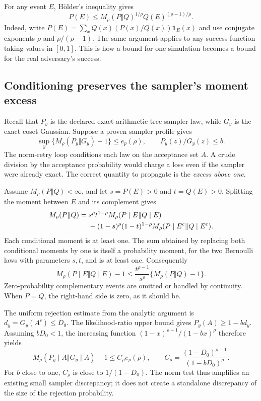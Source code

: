 \documentclass[11pt,a4paper]{article}
\theoremstyle{definition}
\theoremstyle{remark}
\numberwithin{equation}{section}
\begin{document}
For any event $E$, H\"older's inequality gives
\begin{equation}
 P(E)\le M_\rho(P\Vert Q)^{1/\rho}
                  Q(E)^{(\rho-1)/\rho}.
 \label{eq:event-transfer}
\end{equation}
Indeed, write $P(E)=\sum_x Q(x)(P(x)/Q(x))\mathbf1_E(x)$ and use conjugate
exponents $\rho$ and $\rho/(\rho-1)$. The same argument applies to any
success function taking values in $[0,1]$. This is how a bound for one
simulation becomes a bound for the real adversary's success.

\subsection{Conditioning preserves the sampler's moment excess}
\label{sec:tree-sampler}

Recall that $P_y$ is the declared exact-arithmetic tree-sampler law, while
$G_y$ is the exact coset Gaussian. Suppose a proven sampler profile gives
\begin{equation}
 \sup_y\{M_\rho(P_y\Vert G_y)-1\}\le e_p(\rho),
 \qquad P_y(z)/G_y(z)\le b.
 \label{eq:sampler-contract-security}
\end{equation}
The norm-retry loop conditions each law on the acceptance set $A$. A crude
division by the acceptance probability would charge a loss even if the
sampler were already exact. The correct quantity to propagate is the
\emph{excess above one}.

Assume $M_\rho(P\Vert Q)<\infty$, and let $s=P(E)>0$ and $t=Q(E)>0$.
Splitting the moment between $E$ and its
complement gives
\begin{align}
 M_\rho(P\Vert Q)
 ={}&s^\rho t^{1-\rho}M_\rho(P\mid E\Vert Q\mid E)\notag\\
 &+(1-s)^\rho(1-t)^{1-\rho}
        M_\rho(P\mid E^c\Vert Q\mid E^c).
\end{align}
Each conditional moment is at least one. The sum obtained by replacing both
conditional moments by one is itself a probability moment, for the two
Bernoulli laws with parameters $s,t$, and is at least one. Consequently
\begin{equation}
 M_\rho(P\mid E\Vert Q\mid E)-1
 \le \frac{t^{\rho-1}}{s^\rho}
                   \{M_\rho(P\Vert Q)-1\}.
 \label{eq:conditional-excess}
\end{equation}
Zero-probability complementary events are omitted or handled by continuity.
When $P=Q$, the right-hand side is zero, as it should be.

The uniform rejection estimate from the analytic argument is
$d_y=G_y(A^c)\le D_0$. The likelihood-ratio upper bound gives
$P_y(A)\ge1-bd_y$. Assuming $bD_0<1$, the increasing function
$(1-x)^{\rho-1}/(1-bx)^\rho$ therefore yields
\begin{equation}
 M_\rho(P_y\mid A\Vert G_y\mid A)-1
 \le C_\rho e_p(\rho),\qquad
 C_\rho=\frac{(1-D_0)^{\rho-1}}{(1-bD_0)^\rho}.
 \label{eq:conditioned-sampler}
\end{equation}
For $b$ close to one, $C_\rho$ is close to $1/(1-D_0)$. The norm test thus
amplifies an existing small sampler discrepancy; it does not create a
standalone discrepancy of the size of the rejection probability.
\end{document}
